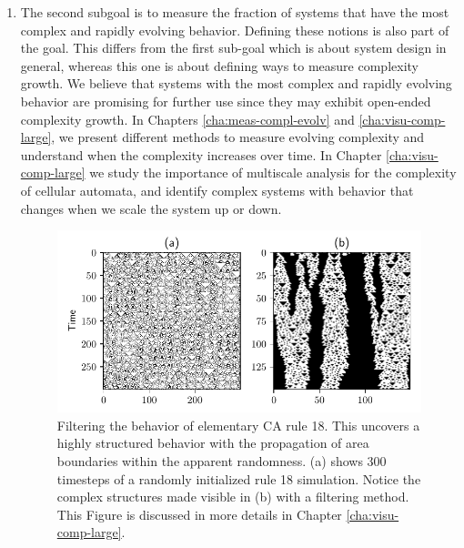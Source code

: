\begin{enumerate}
  \item The second subgoal is to measure the fraction of systems that have the most complex and rapidly
        evolving behavior. Defining these notions is also part of the goal.
        This differs from the first sub-goal which is about system design in general, whereas this one is about defining ways to measure complexity growth.
        We believe that systems with the most complex and rapidly
        evolving behavior are promising for further use since
        they may exhibit open-ended complexity growth. In Chapters
        \ref{cha:meas-compl-evolv} and \ref{cha:visu-comp-large}, we present
        different methods to measure evolving complexity and understand when the
        complexity increases over time. In Chapter \ref{cha:visu-comp-large} we
        study the importance of multiscale analysis for the complexity of
        cellular automata, and identify complex systems with behavior that
        changes when we scale the system up or down.
\begin{figure}[htbp]
  \centering
 \includegraphics[width=.9\linewidth]{figures/rule18_small}
 \caption{Filtering the behavior of elementary \acl{CA} rule 18. This
   uncovers a highly structured behavior with the propagation of area boundaries
   within the apparent randomness. (a) shows 300 timesteps
of a randomly initialized rule 18 simulation. Notice the complex structures made
visible in (b) with a filtering method. This Figure is discussed in more details in Chapter \ref{cha:visu-comp-large}.}
  \label{fig:rule_18}
\end{figure}


\end{enumerate}
